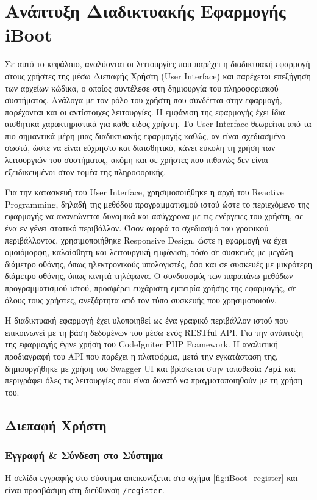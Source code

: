 \chapter{Ανάπτυξη Διαδικτυακής Εφαρμογής iBoot}
Σε αυτό το κεφάλαιο, αναλύονται οι λειτουργίες που παρέχει η διαδικτυακή εφαρμογή στους χρήστες της μέσω Διεπαφής Χρήστη (User Interface) και παρέχεται επεξήγηση των αρχείων κώδικα, ο οποίος συντέλεσε στη δημιουργία του πληροφοριακού συστήματος. Ανάλογα με τον ρόλο του χρήστη που συνδέεται στην εφαρμογή, παρέχονται και οι αντίστοιχες λειτουργίες. Η εμφάνιση της εφαρμογής έχει ίδια αισθητικά χαρακτηριστικά για κάθε είδος χρήστη. Το User Interface θεωρείται από τα πιο σημαντικά μέρη μιας διαδικτυακής εφαρμογής καθώς, αν είναι σχεδιασμένο σωστά, ώστε να είναι εύχρηστο και διαισθητικό, κάνει εύκολη τη χρήση των λειτουργιών του συστήματος, ακόμη και σε χρήστες που πιθανώς δεν είναι εξειδικευμένοι στον τομέα της πληροφορικής.

Για την κατασκευή του User Interface, χρησιμοποιήθηκε η αρχή του Reactive Programming, δηλαδή της μεθόδου προγραμματισμού ιστού ώστε το περιεχόμενο της εφαρμογής να ανανεώνεται δυναμικά και ασύγχρονα με τις ενέργειες του χρήστη, σε ένα εν γένει στατικό περιβάλλον. Όσον αφορά το σχεδιασμό του γραφικού περιβάλλοντος, χρησιμοποιήθηκε Responsive Design, ώστε η εφαρμογή να έχει ομοιόμορφη, καλαίσθητη και λειτουργική εμφάνιση, τόσο σε συσκευές με μεγάλη διάμετρο οθόνης, όπως ηλεκτρονικούς υπολογιστές, όσο και σε συσκευές με μικρότερη διάμετρο οθόνης, όπως κινητά τηλέφωνα. Ο συνδυασμός των παραπάνω μεθόδων προγραμματισμού ιστού, προσφέρει ευχάριστη εμπειρία χρήσης της εφαρμογής, σε όλους τους χρήστες, ανεξάρτητα από τον τύπο συσκευής που χρησιμοποιούν.

Η διαδικτυακή εφαρμογή έχει υλοποιηθεί ως ένα γραφικό περιβάλλον ιστού που επικοινωνεί με τη βάση δεδομένων του μέσω ενός RESTful API. Για την ανάπτυξη της εφαρμογής έγινε χρήση του CodeIgniter PHP Framework. Η αναλυτική προδιαγραφή του API που παρέχει η πλατφόρμα, μετά την εγκατάσταση της, δημιουργήθηκε με χρήση του Swagger UI και βρίσκεται στην τοποθεσία \texttt{/api} και περιγράφει όλες τις λειτουργίες που είναι δυνατό να πραγματοποιηθούν με τη χρήση του.

\section{Διεπαφή Χρήστη}

\subsection{Εγγραφή \& Σύνδεση στο Σύστημα}
\FloatBarrier
Η σελίδα εγγραφής στο σύστημα απεικονίζεται στο σχήμα \ref{fig:iBoot_register} και είναι προσβάσιμη στη διεύθυνση \verb!/register!.


